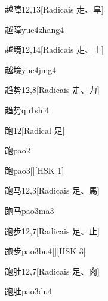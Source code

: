 \begin{entry}{越障}{12,13}[Radicais ⾛、⾩]
  \begin{phonetics}{越障}{yue4zhang4}
  \end{phonetics}
\end{entry}

\begin{entry}{越境}{12,14}[Radicais ⾛、⼟]
  \begin{phonetics}{越境}{yue4jing4}
  \end{phonetics}
\end{entry}

\begin{entry}{趋势}{12,8}[Radicais ⾛、⼒]
  \begin{phonetics}{趋势}{qu1shi4}
  \end{phonetics}
\end{entry}

\begin{entry}{跑}{12}[Radical ⾜]
  \begin{phonetics}{跑}{pao2}
  \end{phonetics}
  \begin{phonetics}{跑}{pao3}[][HSK 1]
  \end{phonetics}
\end{entry}

\begin{entry}{跑马}{12,3}[Radicais ⾜、⾺]
  \begin{phonetics}{跑马}{pao3ma3}
  \end{phonetics}
\end{entry}

\begin{entry}{跑步}{12,7}[Radicais ⾜、⽌]
  \begin{phonetics}{跑步}{pao3bu4}[][HSK 3]
  \end{phonetics}
\end{entry}

\begin{entry}{跑肚}{12,7}[Radicais ⾜、⾁]
  \begin{phonetics}{跑肚}{pao3du4}
  \end{phonetics}
\end{entry}

